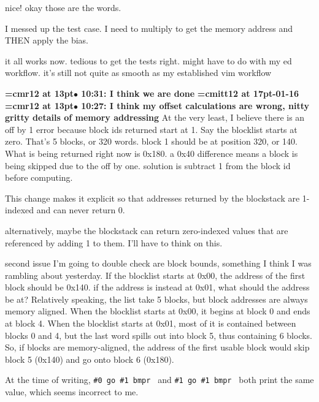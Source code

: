 nice! okay those are the words.
\par

I messed up the test case. I need to multiply to get the memory address and THEN apply the bias.
\par

it all works now. tedious to get the tests right. might have to do with my ed workflow. it's still not quite as smooth as my established vim workflow
\par

{\smallskip\noindent\bf\font\titlefont=cmr12 at 13pt\titlefont $\bullet$ 10:31: I think we are done}\smallskip
{\medskip\noindent\bf\font\titlefont=cmitt12 at 17pt-01-16}\medskip
{\smallskip\noindent\bf\font\titlefont=cmr12 at 13pt\titlefont $\bullet$ 10:27: I think my offset calculations are wrong, nitty gritty details of memory addressing}\smallskip
At the very least, I believe there is an off by 1 error because block ids returned start at 1. Say the blocklist starts at zero. That's 5 blocks, or 320 words. block 1 should be at position 320, or 140. What is being returned right now is 0x180. a 0x40 difference means a block is being skipped due to the off by one. solution is subtract 1 from the block id before computing.
\par

This change makes it explicit so that addresses returned by the blockstack are 1-indexed and can never return 0.
\par

alternatively, maybe the blockstack can return zero-indexed values that are referenced by adding 1 to them. I'll have to think on this.
\par

second issue I'm going to double check are block bounds, something I think I was rambling about yesterday. If the blocklist starts at 0x00, the address of the first block should be 0x140. if the address is instead at 0x01, what should the address be at? Relatively speaking, the list take 5 blocks, but block addresses are always memory aligned. When the blocklist starts at 0x00, it begins at block 0 and ends at block 4. When the blocklist starts at 0x01, most of it is contained between blocks 0 and 4, but the last word spills out into block 5, thus containing 6 blocks. So, if blocks are memory-aligned, the address of the first usable block would skip block 5 (0x140) and go onto block 6 (0x180).
\par

At the time of writing, {\tt \#0 go \#1 bmpr } and {\tt \#1 go \#1 bmpr } both print the same value, which seems incorrect to me.
\par

